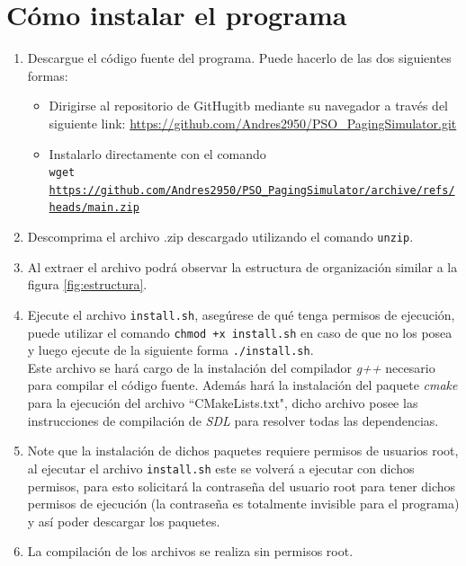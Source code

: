 \documentclass{report}
\begin{document}
\section{Cómo instalar el programa}
\begin{enumerate}
  \item Descargue el código fuente del programa. Puede hacerlo de las dos siguientes formas:
    \begin{itemize}
      \item Dirigirse al repositorio de GitHugitb mediante su navegador a través del siguiente link: \url{https://github.com/Andres2950/PSO\_PagingSimulator.git}
      \item Instalarlo directamente con el comando \\
    \texttt{wget \url{https://github.com/Andres2950/PSO\_PagingSimulator/archive/refs/heads/main.zip}}
    \end{itemize}
  \item Descomprima el archivo .zip descargado utilizando el comando \texttt{unzip}.
  \item Al extraer el archivo podrá observar la estructura de organización similar a la figura \ref{fig:estructura}.
\item Ejecute el archivo \texttt{install.sh}, asegúrese de qué tenga permisos de ejecución, puede utilizar el comando \texttt{chmod +x install.sh} en caso de que no los posea y luego ejecute de la siguiente forma \texttt{./install.sh}. \\
  Este archivo se hará cargo de la instalación del compilador \textit{g++} necesario para compilar el código fuente. Además hará la instalación del paquete \textit{cmake} para la ejecución del archivo ``CMakeLists.txt", dicho archivo posee las instrucciones de compilación de \textit{SDL} para resolver todas las dependencias. 
\item Note que la instalación de dichos paquetes requiere permisos de usuarios root, al ejecutar el archivo \texttt{install.sh} este se volverá a ejecutar con dichos permisos, para esto solicitará la contraseña del usuario root para tener dichos permisos de ejecución (la contraseña es totalmente invisible para el programa) y así poder descargar los paquetes.
\item La compilación de los archivos se realiza sin permisos root.

\end{enumerate}
\end{document}
